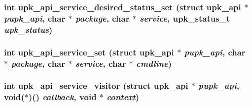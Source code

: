 \subsubsection{\setlength{\rightskip}{0pt plus 5cm}int upk\_\-api\_\-service\_\-desired\_\-status\_\-set (struct \bf{upk\_\-api} $\ast$ {\em pupk\_\-api}, char $\ast$ {\em package}, char $\ast$ {\em service}, upk\_\-status\_\-t {\em upk\_\-status})}\label{upk__api_8c_15f19eb0c06b3aadcb0665f9f78e1040}


\subsubsection{\setlength{\rightskip}{0pt plus 5cm}int upk\_\-api\_\-service\_\-set (struct \bf{upk\_\-api} $\ast$ {\em pupk\_\-api}, char $\ast$ {\em package}, char $\ast$ {\em service}, char $\ast$ {\em cmdline})}\label{upk__api_8c_efd8a314977ae94075b1730d29fe0cb1}


\subsubsection{\setlength{\rightskip}{0pt plus 5cm}int upk\_\-api\_\-service\_\-visitor (struct \bf{upk\_\-api} $\ast$ {\em pupk\_\-api}, void($\ast$)() {\em callback}, void $\ast$ {\em context})}\label{upk__api_8c_93ad493d377d3b400a088d6b3e5b1491}


